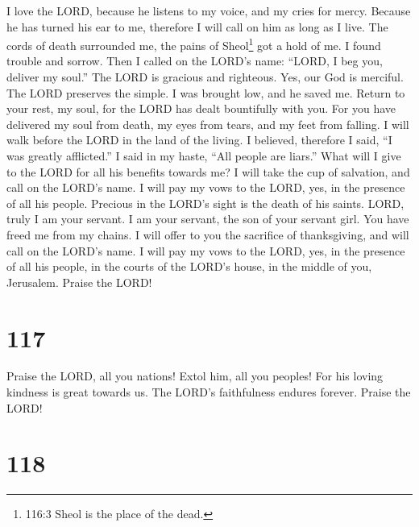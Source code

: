  I love the LORD, because he listens to my voice, and my
cries for mercy.  Because he has turned his ear to me,
therefore I will call on him as long as I live.  The cords
of death surrounded me, the pains of Sheol\footnote{116:3 Sheol is the
  place of the dead.} got a hold of me. I found trouble and sorrow.
 Then I called on the LORD's name: ``LORD, I beg you,
deliver my soul.''  The LORD is gracious and righteous. Yes,
our God is merciful.  The LORD preserves the simple. I was
brought low, and he saved me.  Return to your rest, my soul,
for the LORD has dealt bountifully with you.  For you have
delivered my soul from death, my eyes from tears, and my feet from
falling.  I will walk before the LORD in the land of the
living.  I believed, therefore I said, ``I was greatly
afflicted.''  I said in my haste, ``All people are liars.''
 What will I give to the LORD for all his benefits towards
me?  I will take the cup of salvation, and call on the
LORD's name.  I will pay my vows to the LORD, yes, in the
presence of all his people.  Precious in the LORD's sight
is the death of his saints.  LORD, truly I am your servant.
I am your servant, the son of your servant girl. You have freed me from
my chains.  I will offer to you the sacrifice of
thanksgiving, and will call on the LORD's name.  I will pay
my vows to the LORD, yes, in the presence of all his people,
 in the courts of the LORD's house, in the middle of you,
Jerusalem. Praise the LORD!

\hypertarget{section-109}{%
\section{117}\label{section-109}}

 Praise the LORD, all you nations! Extol him, all you
peoples!  For his loving kindness is great towards us. The
LORD's faithfulness endures forever. Praise the LORD!

\hypertarget{section-110}{%
\section{118}\label{section-110}}

